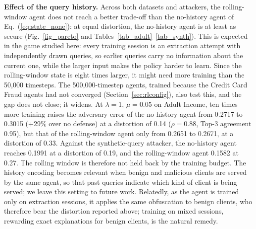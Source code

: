 \documentclass[conference]{IEEEtran}
\DeclareRobustCommand{\rev}[1]{{\color{blue}#1}}
\DeclareRobustCommand{\revnew}[1]{{\color{revpurple}#1}}
\begin{document}
\rev{\textbf{Effect of the query history.} Across both datasets and attackers, the rolling-window agent does not reach a better trade-off than the \revnew{no-history agent of Eq.~(\ref{eq:state_none})}: at equal distortion, the no-history agent is at least as secure (Fig.~\ref{fig_pareto}\revnew{ and Tables~\ref{tab_adult}--\ref{tab_synth}}). This is expected in the game studied here: every training session is an extraction attempt with independently drawn queries, so earlier queries carry no information about the current one, while the larger input makes the policy harder to learn. \revnew{Since the rolling-window state is eight times larger, it might need more training than the 50,000 timesteps. The 500,000-timestep agents, trained because the Credit Card Fraud agents had not converged (Section~\ref{sec:rlconfig}), also test this, and the gap does not close; it widens. At $\lambda=1$, $\mu=0.05$ on Adult Income, ten times more training raises the adversary error of the no-history agent from 0.2717 to 0.3015 (+29\% over no defense) at a distortion of 0.14 ($\rho=0.88$, Top-3 agreement 0.95), but that of the rolling-window agent only from 0.2651 to 0.2671, at a distortion of 0.33. Against the synthetic-query attacker, the no-history agent reaches 0.1991 at a distortion of 0.19, and the rolling-window agent 0.1582 at 0.27. The rolling window is therefore not held back by the training budget.} The history encoding becomes relevant when benign and malicious clients are served by the same agent, so that past queries indicate which kind of client is being served; we leave this setting to future work. Relatedly, as the agent is trained only on extraction sessions, it applies the same obfuscation to benign clients, who therefore bear the distortion reported above; training on mixed sessions, rewarding exact explanations for benign clients, is the natural remedy.}
\end{document}
